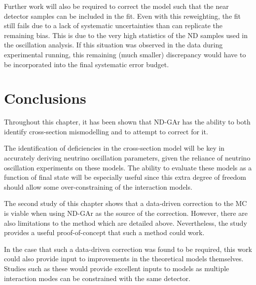 Further work will also be required to correct the model such that the near detector samples can be included in the fit.
Even with this reweighting, the fit still fails due to a lack of systematic uncertainties than can replicate the remaining bias.
This is due to the very high statistics of the ND samples used in the oscillation analysis.
If this situation was observed in the data during experimental running, this remaining (much smaller) discrepancy would have to be incorporated into the final systematic error budget.

\section{Conclusions}
\label{sec:dune_ndrwt:conclusions}

Throughout this chapter, it has been shown that ND-GAr has the ability to both identify cross-section mismodelling and to attempt to correct for it.

The identification of deficiencies in the cross-section model will be key in accurately deriving neutrino oscillation parameters, given the reliance of neutrino oscillation experiments on these models.
The ability to evaluate these models as a function of final state will be especially useful since this extra degree of freedom should allow some over-constraining of the interaction models.

The second study of this chapter shows that a data-driven correction to the MC is viable when using ND-GAr as the source of the correction.
However, there are also limitations to the method which are detailed above. 
Nevertheless, the study provides a useful proof-of-concept that such a method could work.

In the case that such a data-driven correction was found to be required, this work could also provide input to improvements in the theoretical models themselves.
Studies such as these would provide excellent inputs to models as multiple interaction modes can be constrained with the same detector.